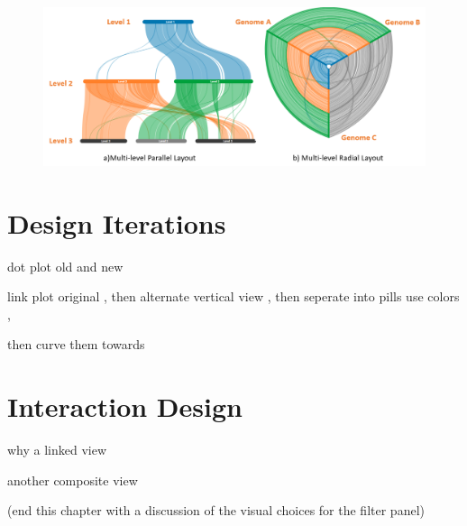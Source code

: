 \begin{figure}
  \centering
  \includegraphics[width=.95\linewidth]{images/ch_4_layout_multi.PNG}
  \label{fig:ch_4_layout}
\end{figure}

\section{Design Iterations}

dot plot old and new 

link plot original , then alternate vertical view , 
then seperate into pills use colors ,

then curve them towards

\section{Interaction Design}

why a linked view

another composite view



(end this chapter with a discussion of the visual choices for the filter panel)
